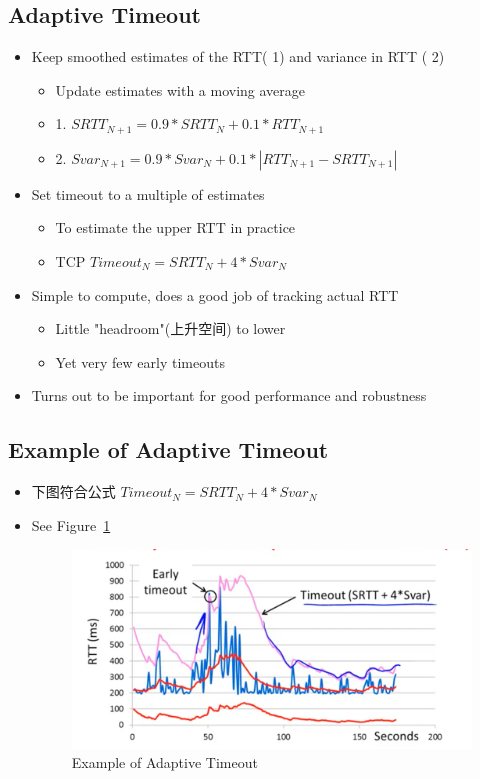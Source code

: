 \documentclass[12pt]{ctexart}   %
\begin{document}
	\subsection{Adaptive Timeout}
	\begin{itemize}
		\item Keep smoothed estimates of the RTT({\color{blue} 1}) and variance in RTT ({\color{blue} 2})
		\begin{itemize}
			\item Update estimates with a moving average
			\item {\color{blue} 1.} $SRTT_{N+1} = 0.9*SRTT_{N} + 0.1*RTT_{N+1}$
			\item {\color{blue} 2.} $Svar_{N+1} = 0.9*Svar_{N} + 0.1*|RTT_{N+1} - SRTT_{N+1}|$
		\end{itemize}
		
		\item Set timeout to a multiple of estimates
		\begin{itemize}
			\item To estimate the upper RTT in practice
			\item TCP $Timeout_{N} = SRTT_{N} + 4*Svar_{N}$
		\end{itemize}
		
		\item Simple to compute, does a good job of tracking actual RTT
		\begin{itemize}
			\item Little "headroom"(上升空间) to lower
			\item Yet very few early timeouts
		\end{itemize}
		
		\item Turns out to be important for good performance and robustness
	\end{itemize}
	
	\subsection{Example of Adaptive Timeout}
	\begin{itemize}
		\item 下图符合公式 $Timeout_{N} = SRTT_{N} + 4*Svar_{N}$
		\item See Figure~\ref{fig:6-7-5}
		  
		 \begin{figure}[h!] %
		\centering
		 \includegraphics[scale=0.7]{images/6-7-5}
		\caption{ Example of Adaptive Timeout }
		 \label{fig:6-7-5}
		 \end{figure}
	\end{itemize}
	
\end{document}
